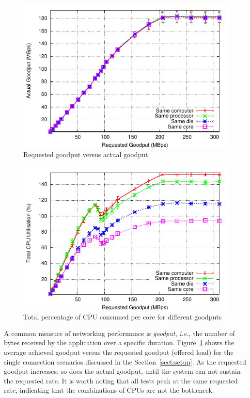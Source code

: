 \documentclass[conference, compsoc]{IEEEtran}
\begin{document}
\begin{figure}[tb]
    \begin{center}
        \includegraphics[height=0.65\columnwidth]{Graphs/intel/two_machines/requested_goodput_vs_actual_throughput}
    \end{center}
    \caption{Requested goodput versus actual goodput}
    \label{fig:goodputs}
\end{figure}

\begin{figure}[tb]
    \begin{center}
        \includegraphics[height=0.65\columnwidth]{Graphs/intel/two_machines/requested_goodput_vs_cpu_total}
    \end{center}
    \caption{Total percentage of CPU consumed per core for different goodputs}
    \label{fig:cpuutil}
\end{figure}

A common measure of networking performance is \emph{goodput}, \emph{i.e.}, the number of bytes received by the application over a specific duration. Figure~\ref{fig:goodputs} shows the average achieved goodput versus the requested goodput (offered load) for the single connection scenarios discussed in the Section~\ref{sect:setup}. As the requested goodput increases, so does the actual goodput, until the system can not sustain the requested rate. It is worth noting that all tests peak at the same requested rate, indicating that the combinations of CPUs are not the bottleneck.
\end{document}
